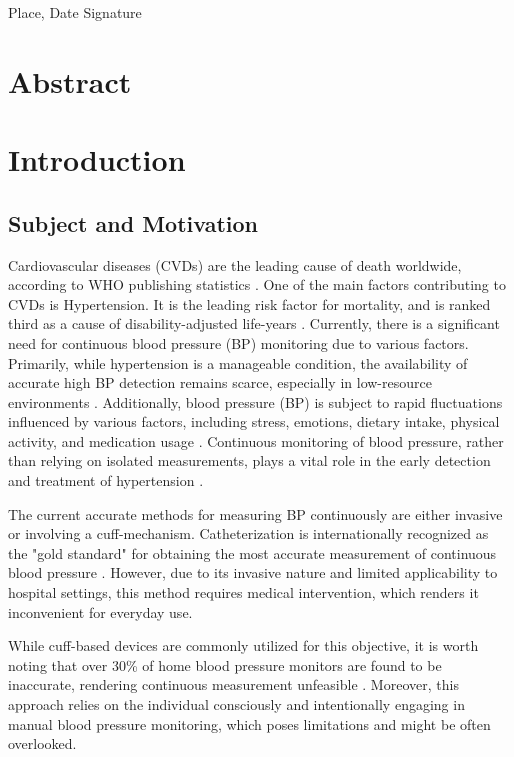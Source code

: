 \documentclass[12pt, bibliography=totoc]{scrartcl}
\begin{document}
Place, Date \tab Signature

\newpage

\tableofcontents

\newpage
\onehalfspacing

\section{Abstract}
\section{Introduction}
\label{introduction}
\subsection{Subject and Motivation}
\label{subject_motivation}

Cardiovascular diseases (CVDs) are the leading cause of death worldwide, according to WHO publishing statistics \cite{organizationWorldHealthStatistics2023}. One of the main factors contributing to CVDs is Hypertension.
It is the leading risk factor for mortality, and is ranked third as a cause of disability-adjusted life-years \cite{ezzatiSelectedMajorRisk2002}.
Currently, there is a significant need for continuous blood pressure (BP) monitoring due to various factors. Primarily, while hypertension is a manageable condition, the availability of accurate high BP detection remains scarce, especially in low-resource environments \cite{burtPrevalenceHypertensionUS1995}. 
Additionally, blood pressure (BP) is subject to rapid fluctuations influenced by various factors, including stress, emotions, dietary intake, physical activity, and medication usage \cite{poonCufflessNoninvasiveMeasurements2005}.
Continuous monitoring of blood pressure, rather than relying on isolated measurements, plays a vital role in the early detection and treatment of hypertension  \cite{el-hajjDeepLearningModels2021}.

The current accurate methods for measuring BP continuously are either invasive or involving a cuff-mechanism.
Catheterization is internationally recognized as the "gold standard" for obtaining the most accurate measurement of continuous blood pressure \cite{sharmaCuffLessContinuousBlood2017}.
However, due to its invasive nature and limited applicability to hospital settings, this method requires medical intervention, which renders it inconvenient for everyday use.

While cuff-based devices are commonly utilized for this objective, it is worth noting that over 30\% of home blood pressure monitors are found to be inaccurate, rendering continuous measurement unfeasible \cite{leungHypertensionCanada20162016}. Moreover, this approach relies on the individual consciously and intentionally engaging in manual blood pressure monitoring, which poses limitations and might be often overlooked.
\end{document}
